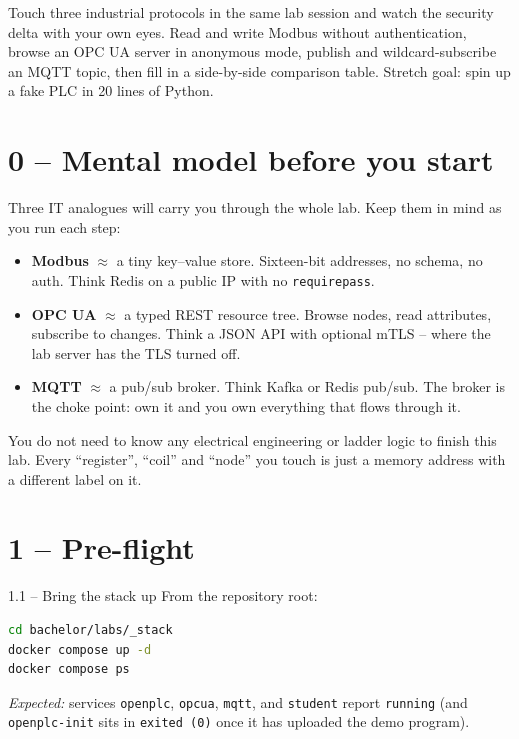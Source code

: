 \documentclass[11pt,a4paper]{article}
\begin{document}
\labheader

\begin{goalbox}
Touch three industrial protocols in the same lab session and watch the
security delta with your own eyes. Read and write Modbus without
authentication, browse an OPC UA server in anonymous mode, publish and
wildcard-subscribe an MQTT topic, then fill in a side-by-side comparison
table. Stretch goal: spin up a fake PLC in 20 lines of Python.
\end{goalbox}

\section*{0 -- Mental model before you start}

Three IT analogues will carry you through the whole lab. Keep them in mind
as you run each step:

\begin{itemize}[leftmargin=*, nosep]
  \item \textbf{Modbus} $\approx$ a tiny key--value store. Sixteen-bit
        addresses, no schema, no auth. Think Redis on a public IP with
        no \texttt{requirepass}.
  \item \textbf{OPC UA} $\approx$ a typed REST resource tree. Browse
        nodes, read attributes, subscribe to changes. Think a JSON API
        with optional mTLS -- where the lab server has the TLS turned
        off.
  \item \textbf{MQTT} $\approx$ a pub/sub broker. Think Kafka or Redis
        pub/sub. The broker is the choke point: own it and you own
        everything that flows through it.
\end{itemize}

You do not need to know any electrical engineering or ladder logic to
finish this lab. Every ``register'', ``coil'' and ``node'' you touch is
just a memory address with a different label on it.

\section*{1 -- Pre-flight}

\begin{stepbox}{1.1 -- Bring the stack up}
From the repository root:
\begin{lstlisting}[language=bash]
cd bachelor/labs/_stack
docker compose up -d
docker compose ps
\end{lstlisting}
\emph{Expected:} services \texttt{openplc}, \texttt{opcua}, \texttt{mqtt},
and \texttt{student} report \texttt{running} (and \texttt{openplc-init}
sits in \texttt{exited (0)} once it has uploaded the demo program).
\end{stepbox}
\end{document}
